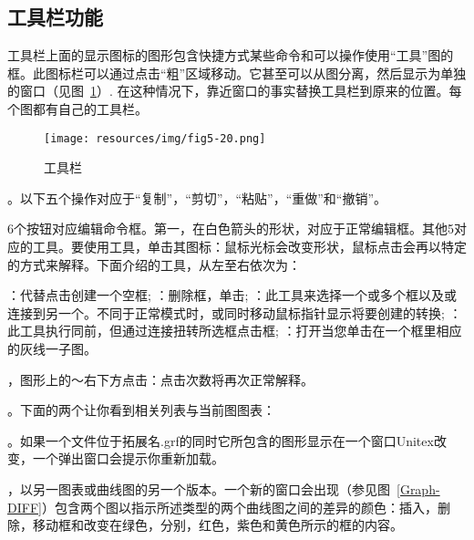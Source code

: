 \subsection{工具栏功能}
\label{toolbar-commands}

工具栏上面的显示图标的图形包含快捷方式某些命令和可以操作使用“工具”图的框。此图标栏可以通过点击“粗”区域移动。它甚至可以从图分离，然后显示为单独的窗口（见图~\ref{fig-toolbar}）.
在这种情况下，靠近窗口的事实替换工具栏到原来的位置。每个图都有自己的工具栏。
\begin{figure}[!ht]
\begin{center}
\texttt{[image: resources/img/fig5-20.png]}
\caption{工具栏\label{fig-toolbar}}
\end{center}
\end{figure}

\bigskip
{}。以下五个操作对应于“复制”，“剪切”，“粘贴”，“重做”和“撤销”。

\bigskip
{}6个按钮对应编辑命令框。第一，在白色箭头的形状，对应于正常编辑框。其他5对应的工具。要使用工具，单击其图标：鼠标光标会改变形状，鼠标点击会再以特定的方式来解释。下面介绍的工具，从左至右依次为：

\begin{itemize}
  ：代替点击创建一个空框;
  ：删除框，单击;
  ：此工具来选择一个或多个框以及或连接到另一个。不同于正常模式时，或同时移动鼠标指针显示将要创建的转换;  ：此工具执行同前，但通过连接扭转所选框点击框;
  ：打开当您单击在一个框里相应的灰线一子图。
\end{itemize}

，图形上的〜右下方点击：点击次数将再次正常解释。

\bigskip
{}。下面的两个让你看到相关列表与当前图图表：

\begin{itemize}
\end{itemize}

。如果一个文件位于拓展名\verb++.grf的同时它所包含的图形显示在一个窗口Unitex改变，一个弹出窗口会提示你重新加载。

\bigskip
{}，以另一图表或曲线图的另一个版本。一个新的窗口会出现（参见图~\ref{Graph-DIFF}）包含两个图以指示所述类型的两个曲线图之间的差异的颜色：插入，删除，移动框和改变在绿色，分别，红色，紫色和黄色所示的框的内容。

